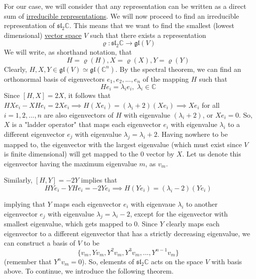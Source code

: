   For our case, we will consider that any representation can be written as a direct sum of \hyperref[def:irreducible-representation-2]{irreducible representations}. We will now proceed to find an irreducible representation of $\mathfrak{sl}_2 \mathbb{C}$. This means that we want to find the smallest (lowest dimensional) \hyperref[def:vector-space]{vector space} $V$ such that there exists a representation
  \begin{equation}
    \varrho: \mathfrak{sl}_2 \mathbb{C} \rightarrow \mathfrak{gl}(V)
  \end{equation}
  We will write, as shorthand notation, that 
  \begin{equation}
    H = \varrho(H), X = \varrho(X), Y = \varrho(Y)
  \end{equation}
  Clearly, $H, X, Y \in \mathfrak{gl}(V) \simeq \mathfrak{gl}(\mathbb{C}^n)$. By the spectral theorem, we can find an orthonormal basis of eigenvectors $e_1, e_2, ..., e_n$ of the mapping $H$ such that
  \begin{equation}
    H e_i = \lambda_i e_i, \; \lambda_i \in \mathbb{C}
  \end{equation}
  Since $[H,X] = 2X$, it follows that $HX e_i - X H e_i = 2X e_i \implies H (X e_i) = (\lambda_i + 2) (X e_i) \implies Xe_i$ for all $i = 1, 2, ..., n$ are also eigenvectors of $H$ with eigenvalue $(\lambda_i + 2)$, or $X e_i = 0$. So, $X$ is a "ladder operator" that maps each eigenvector $e_i$ with eigenvalue $\lambda_i$ to a different eigenvector $e_j$ with eigenvalue $\lambda_j = \lambda_i + 2$. Having nowhere to be mapped to, the eigenvector with the largest eigenvalue (which must exist since $V$ is finite dimensional) will get mapped to the $0$ vector by $X$. Let us denote this eigenvector having the maximum eigenvalue $m$, as $v_m$. 

  Similarly, $[H,Y] = -2Y$ implies that
  \begin{equation}
    HY e_i - YH e_i = -2Y e_i \implies H(Y e_i) = (\lambda_i - 2)(Y e_i)
  \end{equation}

  implying that $Y$ maps each eigenvector $e_i$ with eigenvaue $\lambda_i$ to another eigenvector $e_j$ with eigenvalue $\lambda_j = \lambda_i - 2$, except for the eigenvector with smallest eigenvalue, which gets mapped to $0$. Since $Y$ clearly maps each eigenvector to a different eigenvector that has a strictly decreasing eigenvalue, we can construct a basis of $V$ to be
  \begin{equation}
    \{v_m, Y v_m, Y^2 v_m, Y^3 v_m, ..., Y^{n-1} v_m\}
  \end{equation}
  (remember that $Y^n v_m = 0$). So, elements of $\mathfrak{sl}_2 \mathbb{C}$ acts on the space $V$ with basis above. To continue, we introduce the following theorem. 

